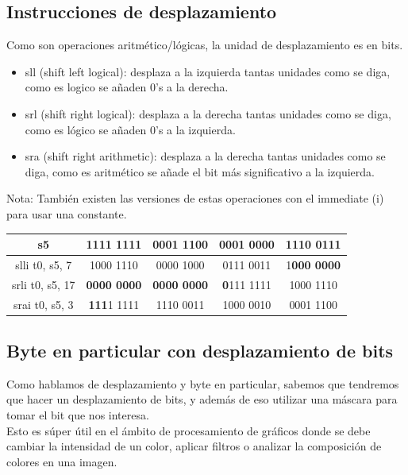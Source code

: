 \documentclass[10pt,a4paper]{article}
\begin{document}
\subsection*{Instrucciones de desplazamiento}
Como son operaciones aritmético/lógicas, la unidad de desplazamiento es en bits.
\begin{itemize}
    \item sll (shift left logical): desplaza a la izquierda tantas unidades como se diga, como es logico se añaden 0's a la derecha.
    \item srl (shift right logical): desplaza a la derecha tantas unidades como se diga, como es lógico se añaden 0's a la izquierda.
    \item sra (shift right arithmetic): desplaza a la derecha tantas unidades como se diga, como es aritmético se añade el bit más significativo a la izquierda.
\end{itemize}
Nota: También existen las versiones de estas operaciones con el immediate (i) para usar una constante.
\begin{table}[h!]
    \centering
    \begin{tabular}{|c | c | c | c| c|}
    \hline
    s5 & 1111 1111 & 0001 1100 & 0001 0000 & 1110 0111 \\ \hline
    slli t0, s5, 7 & 1000 1110 & 0000 1000 & 0111 0011 & 1\textbf{000 0000} \\ \hline
    srli t0, s5, 17 & \textbf{0000 0000} & \textbf{0000 0000} & \textbf{0}111 1111 & 1000 1110\\ \hline
    srai t0, s5, 3 & \textbf{111}1 1111 & 1110 0011 & 1000 0010 & 0001 1100\\ \hline
    \end{tabular}
    \label{tab:desplazamiento_riscv}
\end{table} 
\subsection*{Byte en particular con desplazamiento de bits}
\label{subsec:byte_particular_desplazamiento}
Como hablamos de desplazamiento y byte en particular, sabemos que tendremos que hacer un desplazamiento de bits, y además de eso utilizar una máscara para tomar el bit que nos interesa. \\ 

Esto es súper útil en el ámbito de procesamiento de gráficos donde se debe cambiar la intensidad de un color, aplicar filtros o analizar la composición de colores en una imagen. \\
\end{document}
